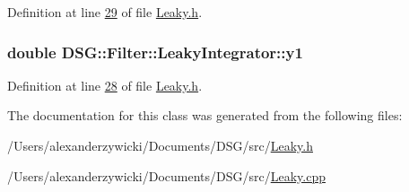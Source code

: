 Definition at line \hyperlink{_leaky_8h_source_l00029}{29} of file \hyperlink{_leaky_8h_source}{Leaky.\+h}.

\hypertarget{class_d_s_g_1_1_filter_1_1_leaky_integrator_a338246cc32a709070753696cf827624c}{
\subsubsection[{y1}]{\setlength{\rightskip}{0pt plus 5cm}double D\+S\+G\+::\+Filter\+::\+Leaky\+Integrator\+::y1\hspace{0.3cm}{\ttfamily [protected]}}}\label{class_d_s_g_1_1_filter_1_1_leaky_integrator_a338246cc32a709070753696cf827624c}


Definition at line \hyperlink{_leaky_8h_source_l00028}{28} of file \hyperlink{_leaky_8h_source}{Leaky.\+h}.



The documentation for this class was generated from the following files\+:\begin{DoxyCompactItemize}
\item 
/\+Users/alexanderzywicki/\+Documents/\+D\+S\+G/src/\hyperlink{_leaky_8h}{Leaky.\+h}\item 
/\+Users/alexanderzywicki/\+Documents/\+D\+S\+G/src/\hyperlink{_leaky_8cpp}{Leaky.\+cpp}\end{DoxyCompactItemize}
